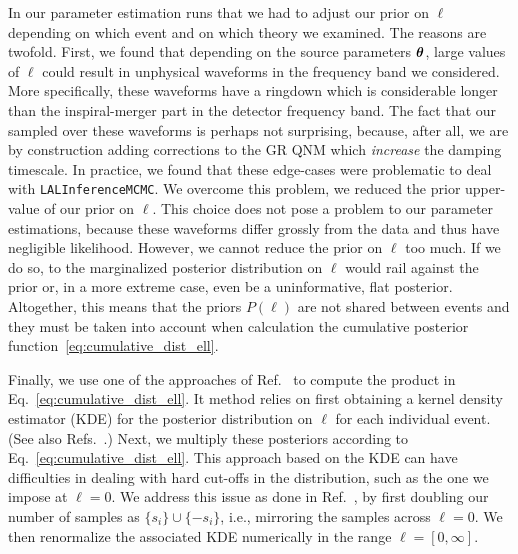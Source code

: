 %
In our parameter estimation runs that we had to adjust our prior on $\ell$ depending on which event and
on which theory we examined.
%
The reasons are twofold.
%
%
First, we found that depending on the source parameters $\bm{\theta}$,
large values of $\ell$ could result in unphysical waveforms in the frequency
band we considered. More specifically, these waveforms have a ringdown which is
considerable longer than the inspiral-merger part in the detector frequency band.
%
The fact that our sampled over these waveforms is perhaps not surprising,
because, after all, we are by construction adding corrections to the GR QNM
which \emph{increase} the damping timescale.
%
In practice, we found that these edge-cases were problematic to deal with
\texttt{LALInferenceMCMC}.
%
We overcome this problem, we reduced the prior upper-value of our prior on $\ell$.
%
This choice does not pose a problem to our parameter estimations, because these
waveforms differ grossly from the data and thus have negligible likelihood.
%
%
However, we cannot reduce the prior on $\ell$ too much. If we do so,
to the marginalized posterior distribution on $\ell$ would rail against
the prior or, in a more extreme case, even be a uninformative, flat posterior.
%
%
Altogether, this means that the priors $P(\ell)$ are not shared between events and
they must be taken into account when calculation the cumulative posterior function~\eqref{eq:cumulative_dist_ell}.

Finally, we use one of the approaches of Ref.~\cite{Perkins:2021mhb} to
compute the product in Eq.~\eqref{eq:cumulative_dist_ell}.
%
It method relies on first obtaining a kernel density estimator (KDE) for
the posterior distribution on $\ell$ for each individual event.
%
(See also Refs.~\cite{DelPozzo:2011pg,Cardenas-Avendano:2019zxd,Carullo:2021dui}.)
%
Next, we multiply these posteriors according to Eq.~\eqref{eq:cumulative_dist_ell}.
%
This approach based on the KDE can have difficulties in dealing with hard cut-offs in the
distribution, such as the one we impose at $\ell = 0$. We address this issue as
done in Ref.~\cite{Perkins:2021mhb}, by first doubling our number of samples as
$\{ s_i \} \cup \{ - s_i \}$, i.e., mirroring the samples across $\ell = 0$.
%
We then renormalize the associated KDE numerically in the range $\ell = [0, \infty]$.
\fi
